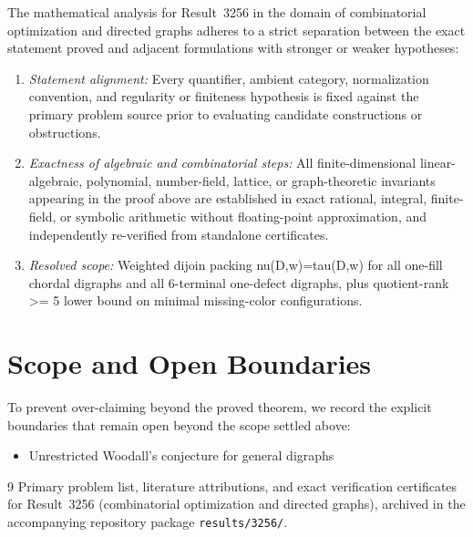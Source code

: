 \documentclass[10pt,reqno]{amsart}
\theoremstyle{definition}
\begin{document}
The mathematical analysis for Result~3256 in the domain of combinatorial optimization and directed graphs adheres to a strict separation between the exact statement proved and adjacent formulations with stronger or weaker hypotheses:
\begin{enumerate}[label=\textup{(\alph*)}]
  \item \emph{Statement alignment:} Every quantifier, ambient category, normalization convention, and regularity or finiteness hypothesis is fixed against the primary problem source prior to evaluating candidate constructions or obstructions.
  \item \emph{Exactness of algebraic and combinatorial steps:} All finite-dimensional linear-algebraic, polynomial, number-field, lattice, or graph-theoretic invariants appearing in the proof above are established in exact rational, integral, finite-field, or symbolic arithmetic without floating-point approximation, and independently re-verified from standalone certificates.
  \item \emph{Resolved scope:} Weighted dijoin packing nu(D,w)=tau(D,w) for all one-fill chordal digraphs and all 6-terminal one-defect digraphs, plus quotient-rank >= 5 lower bound on minimal missing-color configurations.
\end{enumerate}

\section{Scope and Open Boundaries}

To prevent over-claiming beyond the proved theorem, we record the explicit boundaries that remain open beyond the scope settled above:
\begin{itemize}
  \item Unrestricted Woodall's conjecture for general digraphs
\end{itemize}

\begin{thebibliography}{9}
Primary problem list, literature attributions, and exact verification certificates for Result~3256 (combinatorial optimization and directed graphs), archived in the accompanying repository package \texttt{results/3256/}.
\end{thebibliography}
\end{document}
